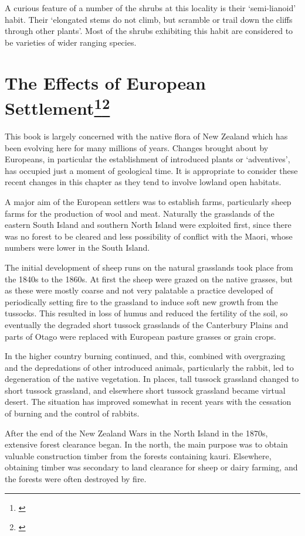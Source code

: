 A curious feature of a number of the shrubs at this locality is their `semi-lianoid' habit.
Their `elongated stems do not climb, but scramble or trail down the cliffs through other plants'.
Most of the shrubs exhibiting this habit are considered to be varieties of wider ranging species.

\section[The Effects of European Settlement]{The Effects of European Settlement\footnote{\cite{healy1980flora}}\footnote{\cite{healy1969adventive}}}

This book is largely concerned with the native flora of New Zealand which has been evolving here for many millions of years.
Changes brought about by Europeans, in particular the establishment of introduced plants or `adventives', has occupied just a moment of geological time.
It is appropriate to consider these recent changes in this chapter as they tend to involve lowland open habitats.

A major aim of the European settlers was to establish farms, particularly sheep farms for the production of wool and meat.
Naturally the grasslands of the eastern South Island and southern North Island were exploited first, since there was no forest to be cleared and less possibility of conflict with the Maori, whose numbers were lower in the South Island.

The initial development of sheep runs on the natural grasslands took place from the 1840s to the 1860s.
At first the sheep were grazed on the native grasses, but as these were mostly coarse and not very palatable a practice developed of periodically setting fire to the grassland to induce soft new growth from the tussocks.
This resulted in loss of humus and reduced the fertility of the soil, so eventually the degraded short tussock grasslands of the Canterbury Plains and parts of Otago were replaced with European pasture grasses or grain crops.

In the higher country burning continued, and this, combined with overgrazing and the depredations of other introduced animals, particularly the rabbit, led to degeneration of the native vegetation.
In places, tall tussock grassland changed to short tussock grassland, and elsewhere short tussock grassland became virtual desert.
The situation has improved somewhat in recent years with the cessation of burning and the control of rabbits.

After the end of the New Zealand Wars in the North Island in the 1870s, extensive forest clearance began.
In the north, the main purpose was to obtain valuable construction timber from the forests containing kauri.
Elsewhere, obtaining timber was secondary to land clearance for sheep or dairy farming, and the forests were often destroyed by fire.

